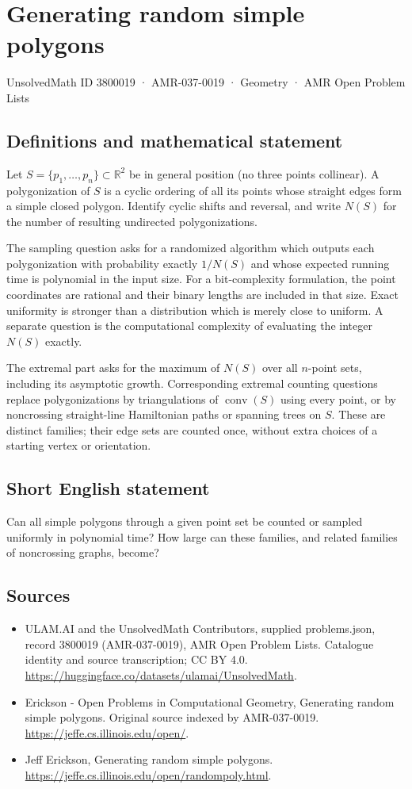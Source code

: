 \documentclass[11pt,a4paper]{article}
\begin{document}
\section*{Generating random simple polygons}\label{3800019}
{\small UnsolvedMath ID 3800019 · AMR-037-0019 · Geometry · AMR Open Problem Lists}
\subsection{Definitions and mathematical statement}
Let $S=\{p_1,\ldots,p_n\}\subset\mathbb R^2$ be in general position
(no three points collinear). A polygonization of $S$ is a cyclic ordering
of all its points whose straight edges form a simple closed polygon.
Identify cyclic shifts and reversal, and write $N(S)$ for the number of
resulting undirected polygonizations.

The sampling question asks for a randomized algorithm which outputs each
polygonization with probability exactly $1/N(S)$ and whose expected
running time is polynomial in the input size. For a bit-complexity
formulation, the point coordinates are rational and their binary lengths
are included in that size. Exact uniformity is stronger than a distribution
which is merely close to uniform. A separate question is the computational
complexity of evaluating the integer $N(S)$ exactly.

The extremal part asks for the maximum of $N(S)$ over all $n$-point sets,
including its asymptotic growth. Corresponding extremal counting questions
replace polygonizations by triangulations of $\operatorname{conv}(S)$ using
every point, or by noncrossing straight-line Hamiltonian paths or spanning
trees on $S$. These are distinct families; their edge sets are counted
once, without extra choices of a starting vertex or orientation.
\subsection{Short English statement}
Can all simple polygons through a given point set be counted or sampled
uniformly in polynomial time? How large can these families, and related
families of noncrossing graphs, become?
\subsection{Sources}
\begin{itemize}
\item[S1] ULAM.AI and the UnsolvedMath Contributors, supplied problems.json, record 3800019 (AMR-037-0019), AMR Open Problem Lists. Catalogue identity and source transcription; CC BY 4.0.
\url{https://huggingface.co/datasets/ulamai/UnsolvedMath}.
\item[S2] Erickson - Open Problems in Computational Geometry, Generating random simple polygons. Original source indexed by AMR-037-0019.
\url{https://jeffe.cs.illinois.edu/open/}.
\item[S3] Jeff Erickson, Generating random simple polygons.
\url{https://jeffe.cs.illinois.edu/open/randompoly.html}.
\end{itemize}
\end{document}
